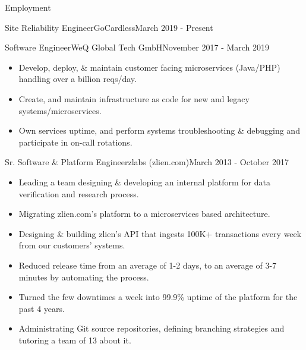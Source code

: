 \documentclass[]{mosabcv}
\begin{document}
\makeheader

\begin{cvsection}{Employment}
    \begin{cvsubsection}{Site Reliability Engineer}{GoCardless}{March 2019 - Present}
        \begin{itemize}
        \end{itemize}
    \end{cvsubsection}
    
    \begin{cvsubsection}{Software Engineer}{WeQ Global Tech GmbH}{November 2017 - March 2019}
        \begin{itemize}
            \item Develop, deploy, \& maintain customer facing microservices (Java/PHP) handling over a billion reqs/day.
            \item Create, and maintain infrastructure as code for new and legacy systems/microservices.
            \item Own services uptime, and perform systems troubleshooting \& debugging and participate in on-call rotations.
        \end{itemize}
    \end{cvsubsection}
            
    \begin{cvsubsection}{Sr. Software \& Platform Engineer}{zlabs (zlien.com)}{March 2013 - October 2017}
        \begin{itemize}
            \item Leading a team designing \& developing an internal platform for data verification and research process.
            \item Migrating zlien.com's platform to a microservices based architecture.
            \item Designing \& building zlien's API that ingests 100K+ transactions every week from our customers' systems.
            \item Reduced release time from an average of 1-2 days, to an average of 3-7 minutes by automating the process.
            \item Turned the few downtimes a week into 99.9\% uptime of the platform for the past 4 years.
            \item Administrating Git source repositories, defining branching strategies and tutoring a team of 13 about it.
        \end{itemize}
    \end{cvsubsection}
    

\end{cvsection}
\end{document}
